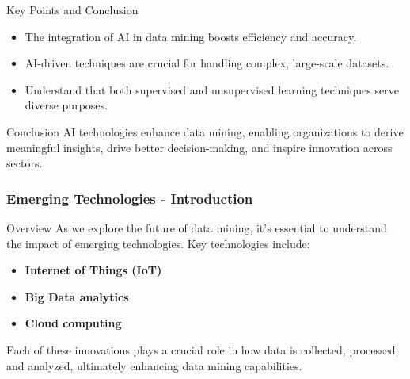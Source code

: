 \documentclass[aspectratio=169]{beamer}
\begin{document}
\begin{frame}[fragile]{Key Points and Conclusion}
    \begin{itemize}
        \item The integration of AI in data mining boosts efficiency and accuracy.
        \item AI-driven techniques are crucial for handling complex, large-scale datasets.
        \item Understand that both supervised and unsupervised learning techniques serve diverse purposes.
    \end{itemize}

    \begin{block}{Conclusion}
        AI technologies enhance data mining, enabling organizations to derive meaningful insights, drive better decision-making, and inspire innovation across sectors.
    \end{block}
\end{frame}

\begin{frame}[fragile]
    \frametitle{Emerging Technologies - Introduction}
    \begin{block}{Overview}
        As we explore the future of data mining, it's essential to understand the impact of emerging technologies. Key technologies include:
        \begin{itemize}
            \item \textbf{Internet of Things (IoT)}
            \item \textbf{Big Data analytics}
            \item \textbf{Cloud computing}
        \end{itemize}
    \end{block}
    Each of these innovations plays a crucial role in how data is collected, processed, and analyzed, ultimately enhancing data mining capabilities.
\end{frame}
\end{document}
